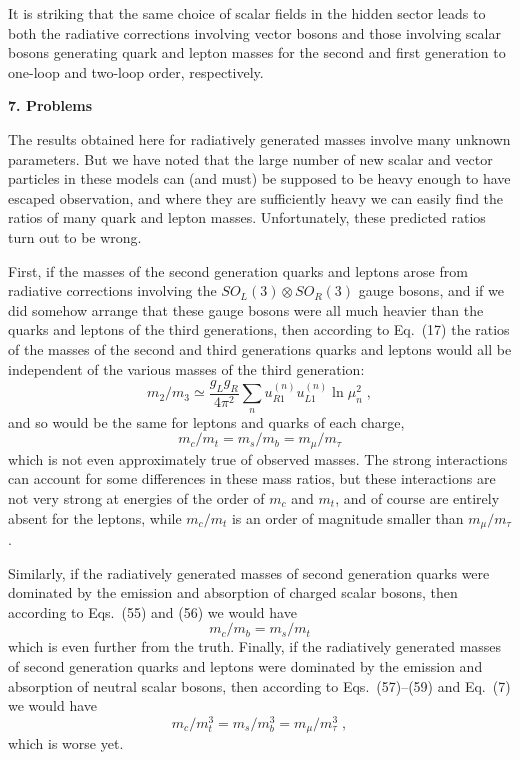 It is striking that the same choice of scalar fields in the hidden sector leads to both the radiative corrections involving vector bosons and those involving scalar bosons generating  quark and lepton masses for the second and first generation  to one-loop and two-loop order, respectively.


\begin{center}
{\bf 7.   Problems}
\end{center}

The results obtained here for radiatively generated masses  involve many unknown parameters.  But we have noted that the large number of new scalar and vector particles in these models can (and must) be supposed to be heavy enough to have escaped observation, and where they are sufficiently heavy we can easily find the ratios of many  quark and lepton masses.   Unfortunately, these predicted ratios turn out to be wrong.

First,  if the masses of the second generation quarks and leptons arose from radiative corrections involving the $SO_L(3)\otimes  SO_R(3)$ gauge bosons, and if we did somehow arrange that these gauge bosons were all much heavier than the quarks and leptons of the third generations, then according to Eq.~(17) the ratios of the masses of the second and third generations  quarks and leptons would all be independent of the various masses of the third generation:
\begin{equation}
m_2/m_3\simeq \frac{g_Lg_R }{4\pi^2}\sum_{n}  u_{R1}^{(n)}u_{L1}^{(n)}\ln \mu_n^2
\;,
\end{equation}
 and so would be the same  for leptons and quarks of each charge, 
\begin{equation}
m_c/m_t=m_s/m_b=m_\mu/m_\tau
\end{equation}
which is not even approximately true of observed masses.  The strong interactions can account for some differences in these mass ratios, but these interactions are not very strong at energies of the order of $m_c$ and $m_t$, and of course are entirely absent for the leptons, while $m_c/m_t$ is an order of magnitude smaller than  $m_\mu/m_\tau$.  

Similarly, if the radiatively generated masses of second generation quarks were dominated by the emission and absorption of charged scalar bosons, then according to Eqs.~(55) and (56) we would have 
\begin{equation}
m_c/m_b=m_s/m_t
\end{equation}
which is even further from the truth.  Finally, if the radiatively generated masses of second generation quarks and leptons were dominated by the emission and absorption of neutral scalar bosons, then according to Eqs.~(57)--(59) and Eq.~(7) we would have 
\begin{equation}
m_c/m_t^3=m_s/m_b^3=m_\mu/m_\tau^3\;,
\end{equation}
which is worse yet.  

